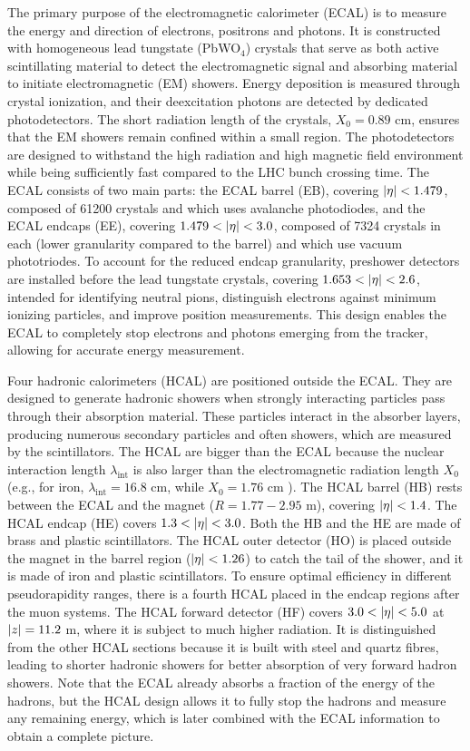 The primary purpose of the electromagnetic calorimeter (ECAL) is to measure the energy and direction of electrons, positrons and photons. It is constructed with homogeneous lead tungstate (PbWO$_4$) crystals that serve as both active scintillating material to detect the electromagnetic signal and absorbing material to initiate electromagnetic (EM) showers. Energy deposition is measured through crystal ionization, and their deexcitation photons are detected by dedicated photodetectors. The short radiation length of the crystals, $X_0 = 0.89$ cm, ensures that the EM showers remain confined within a small region. The photodetectors are designed to withstand the high radiation and high magnetic field environment while being sufficiently fast compared to the LHC bunch crossing time. The ECAL consists of two main parts: the ECAL barrel (EB), covering $\left\lvert\eta\right\rvert < 1.479$, composed of 61200 crystals and which uses avalanche photodiodes, and the ECAL endcaps (EE), covering $1.479 < \left\lvert\eta\right\rvert < 3.0$, composed of 7324 crystals in each (lower granularity compared to the barrel) and which use vacuum phototriodes. To account for the reduced endcap granularity, preshower detectors are installed before the lead tungstate crystals, covering $1.653 < \left\lvert\eta\right\rvert < 2.6$, intended for identifying neutral pions, distinguish electrons against minimum ionizing particles, and improve position measurements. This design enables the ECAL to completely stop electrons and photons emerging from the tracker, allowing for accurate energy measurement.

Four hadronic calorimeters (HCAL) are positioned outside the ECAL. They are designed to generate hadronic showers when strongly interacting particles pass through their absorption material. These particles interact in the absorber layers, producing numerous secondary particles and often showers, which are measured by the scintillators. The HCAL are bigger than the ECAL because the nuclear interaction length $\lambda_\text{int}$ is also larger than the electromagnetic radiation length $X_0$ (e.g., for iron, $\lambda_\text{int}=16.8$ cm, while $X_0=1.76$ cm \cite{Buckley:2021fcn}). The HCAL barrel (HB) rests between the ECAL and the magnet ($R=1.77-2.95$ m), covering $\left\lvert\eta\right\rvert < 1.4$. The HCAL endcap (HE) covers $1.3 < \left\lvert\eta\right\rvert < 3.0$. Both the HB and the HE are made of brass and plastic scintillators. The HCAL outer detector (HO) is placed outside the magnet in the barrel region ($\left\lvert\eta\right\rvert < 1.26$) to catch the tail of the shower, and it is made of iron and plastic scintillators. To ensure optimal efficiency in different pseudorapidity ranges, there is a fourth HCAL placed in the endcap regions after the muon systems. The HCAL forward detector (HF) covers $3.0 < \left\lvert\eta\right\rvert < 5.0$ at $\left\lvert z\right\rvert = 11.2$ m, where it is subject to much higher radiation. It is distinguished from the other HCAL sections because it is built with steel and quartz fibres, leading to shorter hadronic showers for better absorption of very forward hadron showers. Note that the ECAL already absorbs a fraction of the energy of the hadrons, but the HCAL design allows it to fully stop the hadrons and measure any remaining energy, which is later combined with the ECAL information to obtain a complete picture.

